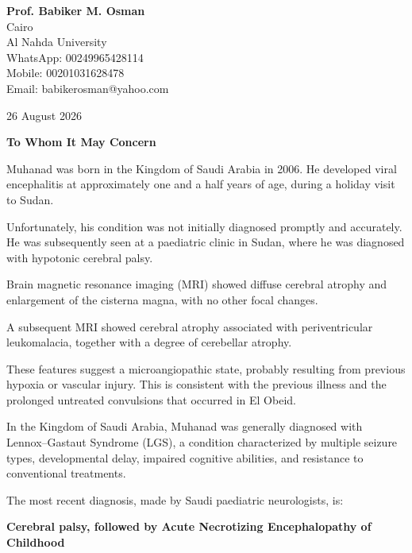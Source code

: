 \documentclass[12pt,a4paper]{article}
\begin{document}
\begin{flushright}
\textbf{Prof. Babiker M. Osman}\\
Cairo\\
Al Nahda University\\
WhatsApp: 00249965428114\\
Mobile: 00201031628478\\
Email: babikerosman@yahoo.com
\end{flushright}

\begin{flushleft}
26 August 2026
\end{flushleft}

\vspace{1em}
\begin{center}
\Large\textbf{To Whom It May Concern}
\end{center}

Muhanad was born in the Kingdom of Saudi Arabia in 2006. He developed viral encephalitis at approximately one and a half years of age, during a holiday visit to Sudan.

Unfortunately, his condition was not initially diagnosed promptly and accurately. He was subsequently seen at a paediatric clinic in Sudan, where he was diagnosed with hypotonic cerebral palsy.

Brain magnetic resonance imaging (MRI) showed diffuse cerebral atrophy and enlargement of the cisterna magna, with no other focal changes.

A subsequent MRI showed cerebral atrophy associated with periventricular leukomalacia, together with a degree of cerebellar atrophy.

These features suggest a microangiopathic state, probably resulting from previous hypoxia or vascular injury. This is consistent with the previous illness and the prolonged untreated convulsions that occurred in El Obeid.

In the Kingdom of Saudi Arabia, Muhanad was generally diagnosed with Lennox--Gastaut Syndrome (LGS), a condition characterized by multiple seizure types, developmental delay, impaired cognitive abilities, and resistance to conventional treatments.

The most recent diagnosis, made by Saudi paediatric neurologists, is:

\begin{center}
\textbf{Cerebral palsy, followed by Acute Necrotizing Encephalopathy of Childhood}
\end{center}
\end{document}

